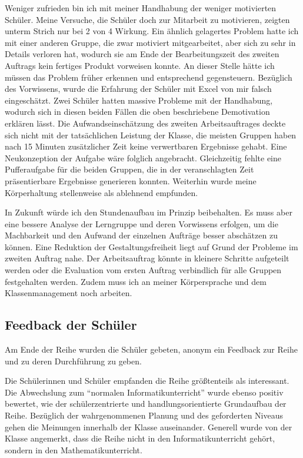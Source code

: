 Weniger zufrieden bin ich mit meiner Handhabung der weniger motivierten Schüler. Meine Versuche, die Schüler doch zur Mitarbeit zu motivieren, zeigten unterm Strich nur bei 2 von 4 Wirkung. Ein ähnlich gelagertes Problem hatte ich mit einer anderen Gruppe, die zwar motiviert mitgearbeitet, aber sich zu sehr in Details verloren hat, wodurch sie am Ende der Bearbeitungszeit des zweiten Auftrags kein fertiges Produkt vorweisen konnte. An dieser Stelle hätte ich müssen das Problem früher erkennen und entsprechend gegensteuern. Bezüglich des Vorwissens, wurde die Erfahrung der Schüler mit Excel von mir falsch eingeschätzt. Zwei Schüler hatten massive Probleme mit der Handhabung, wodurch sich in diesen beiden Fällen die oben beschriebene Demotivation erklären lässt. Die Aufwandseinschätzung des zweiten Arbeitsauftrages deckte sich nicht mit der tatsächlichen Leistung der Klasse, die meisten Gruppen haben nach 15 Minuten zusätzlicher Zeit keine verwertbaren Ergebnisse gehabt. Eine Neukonzeption der Aufgabe wäre folglich angebracht. Gleichzeitig fehlte eine Pufferaufgabe für die beiden Gruppen, die in der veranschlagten Zeit präsentierbare Ergebnisse generieren konnten. Weiterhin wurde meine Körperhaltung stellenweise als ablehnend empfunden. 

In Zukunft würde ich den Stundenaufbau im Prinzip beibehalten. Es muss aber eine bessere Analyse der Lerngruppe und deren Vorwissens erfolgen, um die Machbarkeit und den Aufwand der einzelnen Aufträge besser abschätzen zu können. Eine Reduktion der Gestaltungsfreiheit liegt auf Grund der Probleme im zweiten Auftrag nahe. Der Arbeitsauftrag könnte in kleinere Schritte aufgeteilt werden oder die Evaluation vom ersten Auftrag verbindlich für alle Gruppen festgehalten werden. Zudem muss ich an meiner Körpersprache und dem Klassenmanagement noch arbeiten. 
\subsection{Feedback der Schüler}
Am Ende der Reihe wurden die Schüler gebeten, anonym ein Feedback zur Reihe und zu deren Durchführung zu geben.

Die Schülerinnen und Schüler empfanden die Reihe größtenteils als interessant. Die Abwechslung zum ``normalen Informatikunterricht'' wurde ebenso positiv bewertet, wie der schülerzentrierte und handlungsorientierte Grundaufbau der Reihe. Bezüglich der wahrgenommenen Planung und des geforderten Niveaus gehen die Meinungen innerhalb der Klasse auseinander. Generell wurde von der Klasse angemerkt, dass die Reihe nicht in den Informatikunterricht gehört, sondern in den Mathematikunterricht.